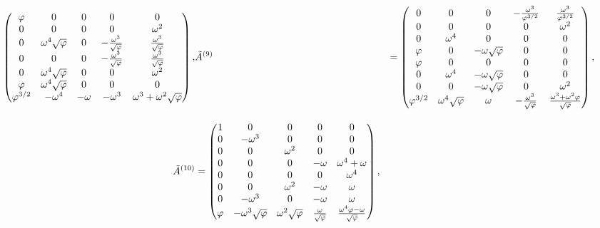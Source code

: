 \begin{align}
\begin{pmatrix}
    \varphi & 0 & 0 & 0 & 0 \\
    0 & 0 & 0 & 0 & \omega^2 \\
    0 & \omega^4 \sqrt{\varphi} & 0 & -\frac{\omega^3}{\sqrt{\varphi}} & \frac{\omega^3}{\sqrt{\varphi}} \\
    0 & 0 & 0 & -\frac{\omega^3}{\sqrt{\varphi}} & \frac{\omega^3}{\sqrt{\varphi}} \\
    0 & \omega^4 \sqrt{\varphi} & 0 & 0 & \omega^2 \\
    \varphi & \omega^4 \sqrt{\varphi} & 0 & 0 & 0 \\
    \varphi^{3/2} & -\omega^4 & -\omega & -\omega^3 & \omega^3+\omega^2 \sqrt{\varphi} \\
  \end{pmatrix}, &
  \tilde{A}^{(9)} &= \begin{pmatrix}
    0 & 0 & 0 & -\frac{\omega^3}{\varphi^{3/2}} & \frac{\omega^3}{\varphi^{3/2}} \\
    0 & 0 & 0 & 0 & \omega^2 \\
    0 & \omega^4 & 0 & 0 & 0 \\
    \varphi & 0 & -\omega\sqrt{\varphi} & 0 & 0 \\
    \varphi & 0 & 0 & 0 & 0 \\
    0 & \omega^4 & -\omega\sqrt{\varphi} & 0 & 0 \\
    0 & 0 & -\omega\sqrt{\varphi} & 0 & \omega^2 \\
    \varphi^{3/2} & \omega^4 \sqrt{\varphi} & \omega & -\frac{\omega^3}{\sqrt{\varphi}} & \frac{\omega^3+\omega^2 \varphi}{\sqrt{\varphi}} \\
  \end{pmatrix}, \notag \\[2ex]
  \tilde{A}^{(10)} &= \begin{pmatrix}
    1 & 0 & 0 & 0 & 0 \\
    0 & -\omega^3 & 0 & 0 & 0 \\
    0 & 0 & \omega^2 & 0 & 0 \\
    0 & 0 & 0 & -\omega & \omega^4+\omega \\
    0 & 0 & 0 & 0 & \omega^4 \\
    0 & 0 & \omega^2 & -\omega & \omega \\
    0 & -\omega^3 & 0 & -\omega & \omega \\
    \varphi & -\omega^3\sqrt{\varphi} & \omega^2 \sqrt{\varphi} & \frac{\omega}{\sqrt{\varphi}} & \frac{\omega^4 \varphi-\omega}{\sqrt{\varphi}} \\
  \end{pmatrix}, &

\end{align}
